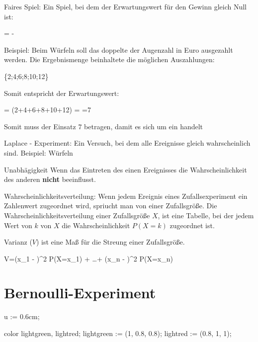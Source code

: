 \bTR
\bTD Faires Spiel: \eTD
\bTD 
Ein Spiel, bei dem der Erwartungswert für den Gewinn gleich Null ist:

\startformula
{} =  - 
\stopformula

Beispiel: Beim Würfeln soll das doppelte der Augenzahl in Euro ausgezahlt werden. Die Ergebnismenge beinhaltete die möglichen Auszahlungen:

\startformula
\{2;4;6;8;10;12\}
\stopformula

Somit entspricht der Erwartungswert:

\startformula
\mu = \cdot (2+4+6+8+10+12) = =7
\stopformula

Somit muss der Einsatz $7$ betragen, damit es sich um ein  handelt
\eTD
\eTR

\bTR
\bTD Laplace - Experiment: \eTD
\bTD
Ein Versuch, bei dem alle Ereignisse gleich wahrscheinlich sind. Beispiel: Würfeln
\eTD
\eTR

\bTR
\bTD Unabhägigkeit \eTD
\bTD
Wenn das Eintreten des einen Ereignisses die Wahrscheinlichkeit des anderen {\bf nicht} beeinflusst.
\eTD
\eTR

\bTR
\bTD Wahrscheinlichkeitsverteilung: \eTD
\bTD 
Wenn jedem Ereignis eines Zufallsexperiment ein Zahlenwert zugeordnet wird, spriucht man von einer Zufallsgröße. Die Wahrscheinlichkeitsverteilung einer Zufallsgröße $X$, ist eine Tabelle, bei der jedem Wert von $k$ von $X$ die Wahrscheinlichkeit $P(X=k)$ zugeordnet ist.

\eTD
\eTR

\bTR
\bTD Varianz ($V$) \eTD
\bTD
ist eine Maß für die Streung einer Zufallsgröße.

\startformula
V=(x_1 - \mu)^2 \cdot P(X=x_1) + \dots + (x_n - \mu)^2 \cdot P(X=x_n)
\stopformula

\eTD
\eTR
\eTABLEbody
\eTABLE
\stopplacetable

\section{Bernoulli-Experiment}

\switchtobodyfont[8pt]
\startMPpage

u := 0.6cm;

color lightgreen, lightred;
lightgreen := (1, 0.8, 0.8);
lightred := (0.8, 1, 1);

